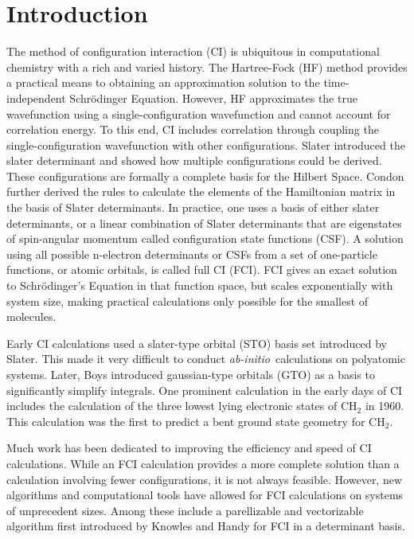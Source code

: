 \documentclass[final,3p,times,twocolumn]{elsarticle}
\newcommand{\ai}{\textit{ab-initio}}
\begin{document}
\section{Introduction} \label{sec:intro}
The method of configuration interaction (CI) is ubiquitous in computational chemistry with a rich and varied history.\cite{shavitt} The Hartree-Fock (HF) method\cite{hartree,fock} provides a practical means to obtaining an approximation solution to the time-independent Schr\"{o}dinger Equation. However, HF approximates the true wavefunction using a single-configuration wavefunction and cannot account for correlation energy.\cite{szabo} To this end, CI includes correlation through coupling the single-configuration wavefunction with other configurations. Slater introduced the slater determinant and showed how multiple configurations could be derived.\cite{slater} These configurations are formally a complete basis for the Hilbert Space. Condon further derived the rules to calculate the elements of the Hamiltonian matrix in the basis of Slater determinants.\cite{condon} In practice, one uses a basis of either slater determinants, or a linear combination of Slater determinants that are eigenstates of spin-angular momentum called configuration state functions (CSF). A solution using all possible n-electron determinants or CSFs from a set of one-particle functions, or atomic orbitals, is called full CI (FCI). FCI gives an exact solution to Schr\"{o}dinger's Equation in that function space, but scales exponentially with system size, making practical calculations only possible for the smallest of molecules.\cite{szabo}

Early CI calculations used a slater-type orbital (STO) basis set introduced by Slater.\cite{sto} This made it very difficult to conduct \ai\ calculations on polyatomic systems.\cite{shavitt} Later, Boys introduced gaussian-type orbitals (GTO) as a basis to significantly simplify integrals.\cite{gto} One prominent calculation in the early days of CI includes the calculation of the three lowest lying electronic states of CH$_2$ in 1960.\cite{boys-1960} This calculation was the first to predict a bent ground state geometry for CH$_2$.

Much work has been dedicated to improving the efficiency and speed of CI calculations. While an FCI calculation provides a more complete solution than a calculation involving fewer configurations, it is not always feasible. However, new algorithms and computational tools have allowed for FCI calculations on systems of unprecedent sizes.\cite{bendazzoli-1995} Among these include a parellizable and vectorizable algorithm first introduced by Knowles and Handy for FCI in a determinant basis.\cite{handy-1984,handy-1988,olsen,evangelisti-1993}
\end{document}
